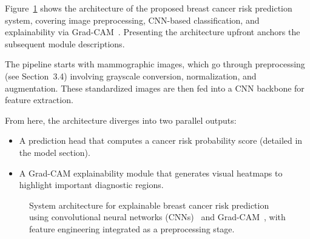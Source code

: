 \documentclass[12pt]{article}
\begin{document}
Figure~\ref{fig:system_architecture} shows the architecture of the proposed breast cancer risk prediction system, covering image preprocessing, CNN-based classification, and explainability via Grad-CAM~\cite{1,5}. Presenting the architecture upfront anchors the subsequent module descriptions.

The pipeline starts with mammographic images, which go through preprocessing (see Section~3.4) involving grayscale conversion, normalization, and augmentation. These standardized images are then fed into a CNN backbone for feature extraction.


From here, the architecture diverges into two parallel outputs:
\begin{itemize}
    \item A prediction head that computes a cancer risk probability score (detailed in the model section).
    \item A Grad-CAM explainability module that generates visual heatmaps to highlight important diagnostic regions.
\end{itemize}

\begin{figure}[H]
    \centering
    \caption{System architecture for explainable breast cancer risk prediction using convolutional neural networks (CNNs)~\cite{1} and Grad-CAM~\cite{5}, with feature engineering integrated as a preprocessing stage.}
    \label{fig:system_architecture}
\end{figure}
\end{document}

